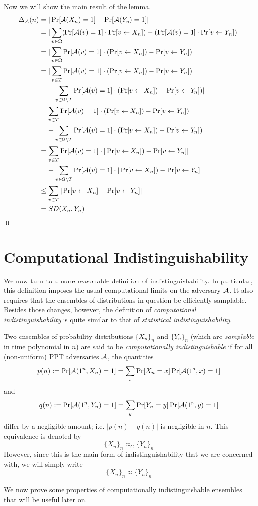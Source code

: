 Now we will show the main result of the lemma.
\begin{align*}
    \Delta_{\mathcal{A}}(n) &= |\Pr[\mathcal{A}(X_n) = 1] - \Pr[\mathcal{A}(Y_n) = 1]| \\
    &= |\sum\limits_{v \in \Omega} (\Pr[\mathcal{A}(v) = 1] \cdot \Pr[v \leftarrow X_n]) - (\Pr[\mathcal{A}(v) = 1] \cdot \Pr[v \leftarrow Y_n])|\\
    &= |\sum\limits_{v \in \Omega} \Pr[\mathcal{A}(v) = 1] \cdot ( \Pr[v \leftarrow X_n]) - \Pr[v \leftarrow Y_n])| \\
    &= |\sum\limits_{v \in T} \Pr[\mathcal{A}(v) = 1] \cdot ( \Pr[v \leftarrow X_n]) - \Pr[v \leftarrow Y_n]) \\
    &\;\;\;\; + \sum\limits_{v \in \Omega \setminus T} \Pr[\mathcal{A}(v) = 1] \cdot ( \Pr[v \leftarrow X_n]) - \Pr[v \leftarrow Y_n])| \\
    &= \sum\limits_{v \in T} \Pr[\mathcal{A}(v) = 1] \cdot ( \Pr[v \leftarrow X_n]) - \Pr[v \leftarrow Y_n]) \\
    &\;\;\;\; + \sum\limits_{v \in \Omega \setminus T} \Pr[\mathcal{A}(v) = 1] \cdot ( \Pr[v \leftarrow X_n]) - \Pr[v \leftarrow Y_n]) \\
    &= \sum\limits_{v \in T} \Pr[\mathcal{A}(v) = 1] \cdot |\Pr[v \leftarrow X_n]) - \Pr[v \leftarrow Y_n]| \\
    &\;\;\;\; + \sum\limits_{v \in \Omega \setminus T} \Pr[\mathcal{A}(v) = 1] \cdot |\Pr[v \leftarrow X_n]) - \Pr[v \leftarrow Y_n]| \\
    &\le \sum\limits_{v \in T} |\Pr[v \leftarrow X_n] - \Pr[v \leftarrow Y_n]|\\
    &= SD(X_n, Y_n)
\end{align*}
\qed

\section{Computational Indistinguishability}
We now turn to a more reasonable definition of indistinguishability.
In particular, this definition imposes the usual computational limits on the adversary $\mathcal{A}$. 
It also requires that the ensembles of distributions in question be efficiently samplable.
Besides those changes, however, the definition of \emph{computational indistinguishability} is quite similar to that of \emph{statistical indistinguishability}.

\begin{definition}
Two ensembles of probability distributions $\{X_n\}_n$ and $\{Y_n\}_n$ (which are \emph{samplable} in time polynomial in $n$) are said to be \emph{computationally indistinguishable} if for all (non-uniform) PPT adversaries $\mathcal{A}$, the quantities
$$p(n) := \Pr[\mathcal{A}(1^n, X_n) = 1] = \sum_x \Pr[X_n = x]\Pr[\mathcal{A}(1^n,x) = 1]$$
and
$$q(n) := \Pr[\mathcal{A}(1^n,Y_n) = 1] = \sum_y \Pr[Y_n = y]\Pr[\mathcal{A}(1^n,y) = 1]$$
differ by a negligible amount; i.e. $|p(n) - q(n)|$ is negligible in $n$.    
This equivalence is denoted by
$$\{X_n\}_n\approx_C \{Y_n\}_n$$
However, since this is the main form of indistinguishability that we are concerned with, we will simply write
$$\{X_n\}_n\approx \{Y_n\}_n$$
\end{definition}
We now prove some properties of computationally indistinguishable ensembles that will be useful later on.

